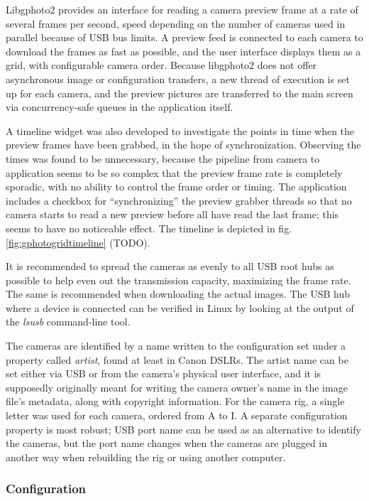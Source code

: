 Libgphoto2 provides an interface for reading a camera preview frame at a rate of several frames per second, speed depending on the number of cameras used in parallel because of USB bus limits.
A preview feed is connected to each camera to download the frames as fast as possible, and the user interface displays them as a grid, with configurable camera order.
Because libgphoto2 does not offer asynchronous image or configuration transfers, a new thread of execution is set up for each camera, and the preview pictures are transferred to the main screen via concurrency-safe queues in the application itself.

A timeline widget was also developed to investigate the points in time when the preview frames have been grabbed, in the hope of synchronization.
Observing the times was found to be unnecessary, because the pipeline from camera to application seems to be so complex that the preview frame rate is completely sporadic, with no ability to control the frame order or timing.
The application includes a checkbox for ``synchronizing'' the preview grabber threads so that no camera starts to read a new preview before all have read the last frame; this seems to have no noticeable effect.
The timeline is depicted in fig. \ref{fig:gphotogridtimeline} (TODO).

It is recommended to spread the cameras as evenly to all USB root hubs as possible to help even out the transmission capacity, maximizing the frame rate.
The same is recommended when downloading the actual images.
The USB hub where a device is connected can be verified in Linux by looking at the output of the \emph{lsusb} command-line tool.

The cameras are identified by a name written to the configuration set under a property called \emph{artist}, found at least in Canon DSLRs.
The artist name can be set either via USB or from the camera's physical user interface, and it is supposedly originally meant for writing the camera owner's name in the image file's metadata, along with copyright information.
For the camera rig, a single letter was used for each camera, ordered from A to I.
A separate configuration property is most robust; USB port name can be used as an alternative to identify the cameras, but the port name changes when the cameras are plugged in another way when rebuilding the rig or using another computer.


\subsubsection{Configuration} %

